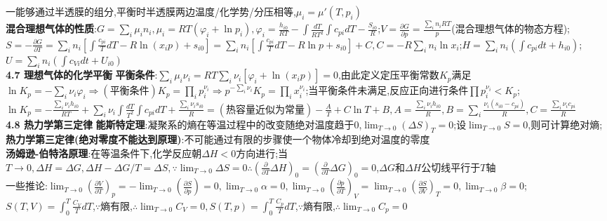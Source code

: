 \documentclass[10pt,a4paper]{article}
\begin{document}
\begin{multicols}{2}
一能够通过半透膜的组分,平衡时半透膜两边温度/化学势/分压相等,$\mu_i=\mu'(T,p_i)$\\
\textbf{混合理想气体的性质}:$G=\sum_i\mu_in_i,\mu_i=RT(\varphi_i+\ln p_i),\varphi_i=\frac{h_{i0}}{RT}-\int\frac{dT}{RT^2}\int c_{pi}dT-\frac{S_{i0}}{R}$;$V=\frac{\partial G}{\partial p}=\frac{\sum_in_iRT}{p}$(混合理想气体的物态方程);$S=-\frac{\partial G}{\partial T}=\sum_in_i\left[\int\frac{c_{pi}}{T}dT-R\ln(x_ip)+s_{i0}\right]=\sum_in_i\left[\int\frac{c_{pi}}{T}dT-R\ln p+s_{i0}\right]+C,C=-R\sum_in_i\ln x_i$;$H=\sum_in_i(\int c_{pi}dt+h_{i0})$;$U=\sum_in_i(\int c_{Vi}dt+U_{i0})$\\
\textbf{4.7 理想气体的化学平衡}
\textbf{平衡条件}:$\sum_i\mu_i\nu_i=RT\sum_i\nu_i[\varphi_i+\ln(x_ip)]=0$,由此定义定压平衡常数$K_p$满足$\ln K_p=-\sum_i\nu_i\varphi_i\Rightarrow(\text{平衡条件})K_p=\prod_ip_i^{\nu_i}\Rightarrow p^{-\sum_i\nu_i}K_p=\prod_ix_i^{\nu_i}$;当平衡条件未满足,反应正向进行条件$\prod p_i^{\nu_i}<K_p$;$\ln K_p=-\frac{\sum_i\nu_ih_{i0}}{RT}+\sum_i\nu_i\int\frac{dT}{T^2}\int c_{pi}dT+\frac{\sum_i\nu_is_{i0}}{R}=(\textbf{热容量近似为常量})-\frac{A}{T}+C\ln T+B,A=\frac{\sum_i\nu_ih_{i0}}{R},B=\sum_i\frac{\nu_i(s_{i0}-c_{pi})}{R},C=\frac{\sum_i\nu_ic_{pi}}{R}$\\
\textbf{4.8 热力学第三定律}
\textbf{能斯特定理}:凝聚系的熵在等温过程中的改变随绝对温度趋于$0$,$\lim_{T\rightarrow0}(\Delta S)_T=0$;设$\lim_{T\rightarrow0}S=0$,则可计算绝对熵;\textbf{热力学第三定律(绝对零度不能达到原理)}:不可能通过有限的步骤使一个物体冷却到绝对温度的零度\\
\textbf{汤姆逊-伯特洛原理}:在等温条件下,化学反应朝$\Delta H<0$方向进行;当$T\rightarrow0,\Delta H=\Delta G,{\Delta H-\Delta G}/{T}=\Delta S,\because\lim_{T\rightarrow0}\Delta S=0\therefore\left(\frac{\partial}{\partial T}\Delta H\right)_0=\left(\frac{\partial}{\partial T}\Delta G\right)_0=0$,$\Delta G$和$\Delta H$公切线平行于$T$轴\\
一些推论:$\lim_{T\rightarrow0}\left(\frac{\partial V}{\partial T}\right)_p=-\lim_{T\rightarrow0}\left(\frac{\partial S}{\partial p}\right)=0,\lim_{T\rightarrow0}\alpha=0,\lim_{T\rightarrow0}\left(\frac{\partial p}{\partial T}\right)_V=\lim_{T\rightarrow0}\left(\frac{\partial S}{\partial V}\right)_T=0,\lim_{T\rightarrow0}\beta=0$;$S(T,V)=\int_0^T\frac{C_V}{T}dT$,$\because$熵有限,$\therefore\lim_{T\rightarrow0}C_V=0,S(T,p)=\int_0^T\frac{C_p}{T}dT$,$\because$熵有限,$\therefore\lim_{T\rightarrow0}C_p=0$
\end{multicols}
\end{document}
